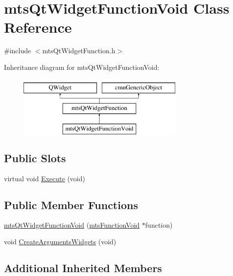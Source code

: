 \hypertarget{classmts_qt_widget_function_void}{}\section{mts\+Qt\+Widget\+Function\+Void Class Reference}
\label{classmts_qt_widget_function_void}


{\ttfamily \#include $<$mts\+Qt\+Widget\+Function.\+h$>$}

Inheritance diagram for mts\+Qt\+Widget\+Function\+Void\+:\begin{figure}[H]
\begin{center}
\leavevmode
\includegraphics[height=3.000000cm]{d8/daa/classmts_qt_widget_function_void}
\end{center}
\end{figure}
\subsection*{Public Slots}
\begin{DoxyCompactItemize}
\item 
virtual void \hyperlink{classmts_qt_widget_function_void_adfd0b4dcf0b595207c106a85679a1e69}{Execute} (void)
\end{DoxyCompactItemize}
\subsection*{Public Member Functions}
\begin{DoxyCompactItemize}
\item 
\hyperlink{classmts_qt_widget_function_void_ab4e9842b62d6eaa2893adcc1a1045fc0}{mts\+Qt\+Widget\+Function\+Void} (\hyperlink{classmts_function_void}{mts\+Function\+Void} $\ast$function)
\item 
void \hyperlink{classmts_qt_widget_function_void_afc826cb2dc6a2ea97ee63ab90e2a316f}{Create\+Arguments\+Widgets} (void)
\end{DoxyCompactItemize}
\subsection*{Additional Inherited Members}



